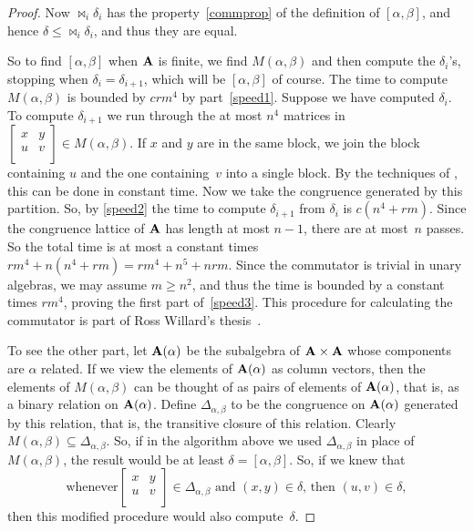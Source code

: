 \documentclass{ws-ijac}
\begin{document}
\begin{proof}
Now $\Join_i \delta_i$ has the property~\eqref{commprop} of the
definition of $[\alpha,\beta]$,
and hence $\delta \le \Join_i \delta_i$, and thus they are equal.

So to find $[\alpha,\beta]$ when $\mathbf{A}$ is finite, we find
$M(\alpha,\beta)$ and then compute the $\delta_i$'s, stopping when
$\delta_i = \delta_{i+1}$, which will be $[\alpha,\beta]$ of course.
The time to compute $M(\alpha,\beta)$ is bounded by $crm^4$ by
part~\eqref{speed1}. Suppose we have computed $\delta_i$. To
compute $\delta_{i+1}$ we run through the at most $n^4$ matrices
in
$\begin{bmatrix}
x & y \\
u & v\\
\end{bmatrix} \in M(\alpha,\beta)$. If $x$ and $y$ are in the same
block, we join the block containing $u$ and the one containing~$v$
into a single block. By the techniques of \cite{Freese2008},
this can be done in constant time. Now we take the congruence generated
by this partition. So, by \eqref{speed2} the time to compute
$\delta_{i+1}$ from $\delta_i$ is $c(n^4 + rm)$. Since the congruence
lattice of $\mathbf{A}$ has length at most $n-1$, there are at most~$n$
passes. So the total time is at most a constant times
$rm^4 + n(n^4 + rm) = rm^4 + n^5 + nrm$.
Since the commutator is trivial in unary algebras, we may
assume $m \ge n^2$, and thus the time is bounded by a
constant times $rm^4$, proving the first part of~\eqref{speed3}.
This procedure for calculating the commutator is part
of Ross Willard's thesis~\cite{MR2637477}.

To see the other part,
let $\mathbf{A}(\alpha)$ be the subalgebra
of $\mathbf{A} \times \mathbf{A}$ whose components are $\alpha$ related. If we
view the elements of $\mathbf{A}(\alpha)$ as column vectors, then the
elements of $M(\alpha,\beta)$ can be thought of as pairs of elements
of $\mathbf{A}(\alpha)$, that is, as a binary relation on $\mathbf{A}(\alpha)$.
Define $\Delta_{\alpha,\beta}$ to be the congruence on $\mathbf{A}(\alpha)$
generated by this relation, that is,
the transitive closure of this relation.
Clearly $M(\alpha,\beta) \subseteq
\Delta_{\alpha,\beta}$. So, if in the algorithm above we used
$\Delta_{\alpha,\beta}$ in place of $M(\alpha,\beta)$, the result
would be at least $\delta = [\alpha,\beta]$. So, if we knew that
\begin{equation}\label{deltaStatement}
\text{whenever
$\begin{bmatrix}
x & y \\
u & v\\
\end{bmatrix} \in \Delta_{\alpha,\beta}$ and $(x,y) \in \delta$,
then $(u,v) \in \delta$},
\end{equation}
then this modified procedure would also
compute~$\delta$.


\end{proof}
\end{document}
